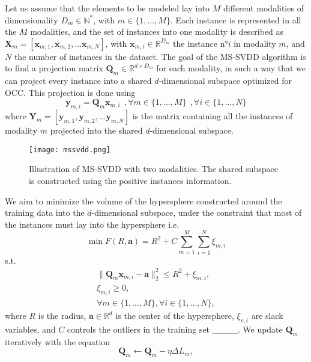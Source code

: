 Let us assume that the elements to be modeled lay into $M$ different modalities of dimensionality $D_m \in \mathbb{N^{*}}$, with $m \in \{1, ..., M\}$. Each instance is represented in all the $M$ modalities, and the set of instances into one modality is described as $\mathbf{X}_m = [\mathbf{x}_{m,1}, \mathbf{x}_{m,2}, ... \mathbf{x}_{m,N}]$, with $\mathbf{x}_{m,i} \in \mathbb{R}^{D_m}$ the instance n°$i$ in modality $m$, and $N$ the number of instances in the dataset.
The goal of the MS-SVDD algorithm is to find a projection matrix $\mathbf{Q}_m \in \mathbb{R}^{d \times D_m}$ for each modality, in such a way that we can project every instance into a shared $d$-dimensional subspace optimized for OCC. This projection is done using  
\begin{equation}\label{eq:Y_i}
\mathbf{y}_{m,i} = \mathbf{Q}_m \mathbf{x}_{m,i} \:\:,\forall m \in \{1,\dots,M\} \:\:, \forall i \in \{1,\dots,N\}
\end{equation}
where $\mathbf{Y}_m = [\mathbf{y}_{m,1}, \mathbf{y}_{m,2}, ... \mathbf{y}_{m,N}]$ is the matrix containing all the instances of modality $m$ projected into the shared $d$-dimensional subspace.
\begin{figure}[t]
    \centering
    \texttt{[image: mssvdd.png]}
    \caption{Illustration of MS-SVDD with two modalities. The shared subspace is constructed using the positive instances information.}
    \label{fig:mssvdd}
\end{figure}
We aim to minimize the volume of the hypersphere constructed around the training data into the $d$-dimensional subspace, under the constraint that most of the instances must lay into the hypersphere i.e.
\begin{equation}\label{eq:F_R_a}
\min F(R,\textbf{a}) = R^2 + C\sum_{m=1}^{M}\sum_{i=1}^{N} \xi_{m,i}\nonumber
\end{equation}
s.t.
\begin{eqnarray}\label{eq:F_R_a_st}
\| {\mathbf{Q}_m\mathbf{x}_{m,i}} - \mathbf{a} \|^2_{2} \le R^2 + \xi_{m,i},\\
\xi_{m,i} \ge 0,\nonumber \\
\forall m \in \{1,\dots,M\}, \forall i \in \{1,\dots,N\} ,\nonumber 
\end{eqnarray}
where $R$ is the radius, $\mathbf{a} \in \mathbb{R}^d$ is the center of the hypersphere, $\xi_{v,i}$ are slack variables, and $C$ controls the outliers in the training set ____. We update $\mathbf{Q}_m$ iteratively with the equation 
\begin{equation}\label{eq:Q_m_update}
\mathbf{Q}_m \leftarrow \mathbf{Q}_m - \eta \Delta L_m,
\end{equation}
